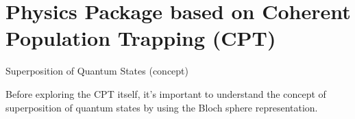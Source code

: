 \section{Physics Package based on Coherent Population Trapping (CPT)}

\begin{frame}{Superposition of Quantum States (concept)}

    Before exploring the CPT itself, it's important to understand the concept of superposition of quantum states by using the Bloch sphere representation.

    \begin{columns}

        \begin{column}{0.32\textwidth}


        \end{column}

        \begin{column}{0.32\textwidth}


\end{column}
\end{columns}
\end{frame}
